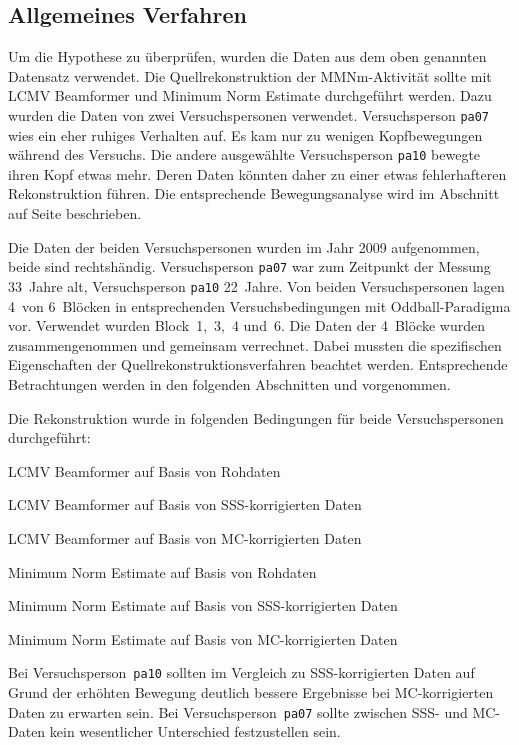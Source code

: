 \documentclass[doc,a4paper,12pt]{apa6}
\makeatletter
\DeclareRobustCommand*{\nameref}[1]{%
      \glqq{\myorg@nameref{#1}}\grqq%
    }%
\makeatother
\begin{document}
\subsection{Allgemeines Verfahren}

Um die Hypothese zu überprüfen, wurden die Daten aus dem oben genannten Datensatz verwendet. Die Quellrekonstruktion der MMNm-Aktivität sollte mit LCMV Beamformer und Minimum Norm Estimate durchgeführt werden. Dazu wurden die Daten von zwei Versuchspersonen verwendet. Versuchsperson \texttt{pa07} wies ein eher ruhiges Verhalten auf. Es kam nur zu wenigen Kopfbewegungen während des Versuchs. Die andere ausgewählte Versuchsperson \texttt{pa10} bewegte ihren Kopf etwas mehr. Deren Daten könnten daher zu einer etwas fehlerhafteren Rekonstruktion führen. Die entsprechende Bewegungsanalyse wird im Abschnitt \nameref{sec:bewegung} auf Seite \pageref{sec:bewegung} beschrieben.

Die Daten der beiden Versuchspersonen wurden im Jahr 2009 aufgenommen, beide sind rechtshändig. Versuchsperson \texttt{pa07} war zum Zeitpunkt der Messung 33~Jahre alt, Versuchsperson \texttt{pa10} 22~Jahre. Von beiden Versuchspersonen lagen 4~von 6~Blöcken in entsprechenden Versuchsbedingungen mit Oddball-Paradigma vor. Verwendet wurden Block~1,~3,~4 und~6. Die Daten der 4~Blöcke wurden zusammengenommen und gemeinsam verrechnet. Dabei mussten die spezifischen Eigenschaften der Quellrekonstruktionsverfahren beachtet werden. Entsprechende Betrachtungen werden in den folgenden Abschnitten \nameref{sec:lead-beam-mne} und \nameref{sec:amplitud} vorgenommen.

Die Rekonstruktion wurde in folgenden Bedingungen für beide Versuchspersonen durchgeführt:

\begin{compactitem}
\item LCMV Beamformer auf Basis von Rohdaten
\item LCMV Beamformer auf Basis von SSS-korrigierten Daten
\item LCMV Beamformer auf Basis von MC-korrigierten Daten
\item Minimum Norm Estimate auf Basis von Rohdaten
\item Minimum Norm Estimate auf Basis von SSS-korrigierten Daten
\item Minimum Norm Estimate auf Basis von MC-korrigierten Daten
\end{compactitem}

Bei Versuchsperson~\texttt{pa10} sollten im Vergleich zu SSS-korrigierten Daten auf Grund der erhöhten Bewegung deutlich bessere Ergebnisse bei MC-korrigierten Daten zu erwarten sein. Bei Versuchsperson~\texttt{pa07} sollte zwischen SSS- und MC-Daten kein wesentlicher Unterschied festzustellen sein.
\end{document}
